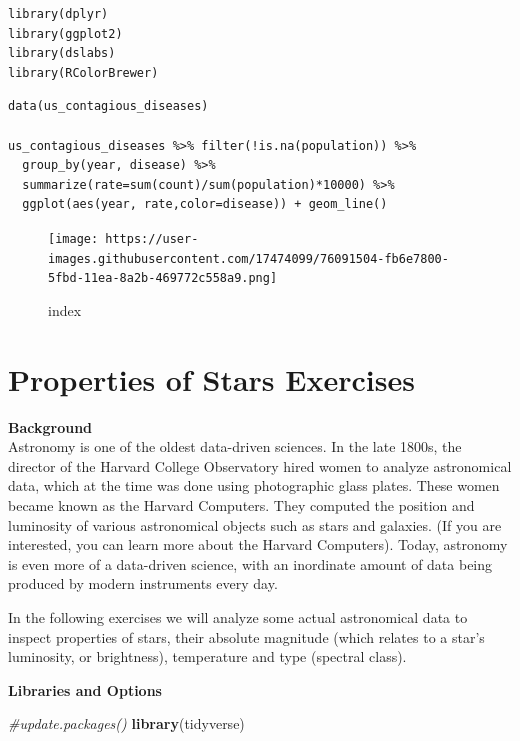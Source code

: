 \documentclass[
]{article}
\newenvironment{Shaded}{\begin{snugshade}}{\end{snugshade}}
\newcommand{\CommentTok}[1]{\textcolor[rgb]{0.56,0.35,0.01}{\textit{#1}}}
\newcommand{\KeywordTok}[1]{\textcolor[rgb]{0.13,0.29,0.53}{\textbf{#1}}}
\newcommand{\NormalTok}[1]{#1}
\begin{document}
\begin{verbatim}
library(dplyr)
library(ggplot2)
library(dslabs)
library(RColorBrewer)
\end{verbatim}

\begin{verbatim}
data(us_contagious_diseases)

us_contagious_diseases %>% filter(!is.na(population)) %>% 
  group_by(year, disease) %>%
  summarize(rate=sum(count)/sum(population)*10000) %>%
  ggplot(aes(year, rate,color=disease)) + geom_line()
\end{verbatim}

\begin{figure}
\centering
\texttt{[image: https://user-images.githubusercontent.com/17474099/76091504-fb6e7800-5fbd-11ea-8a2b-469772c558a9.png]}
\caption{index}
\end{figure}

\hypertarget{properties-of-stars-exercises}{%
\section{Properties of Stars
Exercises}\label{properties-of-stars-exercises}}

\textbf{Background}\\
Astronomy is one of the oldest data-driven sciences. In the late 1800s,
the director of the Harvard College Observatory hired women to analyze
astronomical data, which at the time was done using photographic glass
plates. These women became known as the Harvard Computers. They computed
the position and luminosity of various astronomical objects such as
stars and galaxies. (If you are interested, you can learn more about the
Harvard Computers). Today, astronomy is even more of a data-driven
science, with an inordinate amount of data being produced by modern
instruments every day.

In the following exercises we will analyze some actual astronomical data
to inspect properties of stars, their absolute magnitude (which relates
to a star's luminosity, or brightness), temperature and type (spectral
class).

\textbf{Libraries and Options}

\begin{Shaded}
\begin{Highlighting}[]
\CommentTok{#update.packages()}
\KeywordTok{library}\NormalTok{(tidyverse)}
\end{Highlighting}
\end{Shaded}
\end{document}

